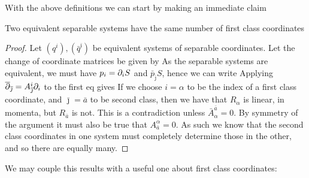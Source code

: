 \documentclass{article}
\begin{document}
With the above definitions we can start by making an immediate claim 

\begin{prop}
Two equivalent separable systems have the same number of first class coordinates
\end{prop}
\begin{proof}
Let $(q^i), (\bar{q}^{\bar{\imath}})$ be equivalent systems of separable coordinates. Let the change of coordinate matrices be given by 
As the separable systems are equivalent, we must have $p_i  = \partial_i S$ and $\bar{p}_{\bar{\jmath}} S$, hence we can write
Applying $\overline{\partial}_{\overline{\jmath}} = A^i_{\overline{\jmath}} \partial_i$ to the first eq gives
If we choose $i=\alpha$ to be the index of a first class coordinate, and $\bar{\jmath} = \bar{a}$ to be second class, then we have that $R_\alpha$ is linear, in momenta, but $R_{\bar{a}}$ is not. This is a contradiction unless $\bar{A}^{\bar{a}}_\alpha = 0$. By symmetry of the argument it must also be true that $A^\alpha_{\bar{a}}=0$. As such we know that the second class coordinates in one system must completely determine those in the other, and so there are equally many.
\end{proof}

We may couple this results with a useful one about first class coordinates: 
\end{document}
